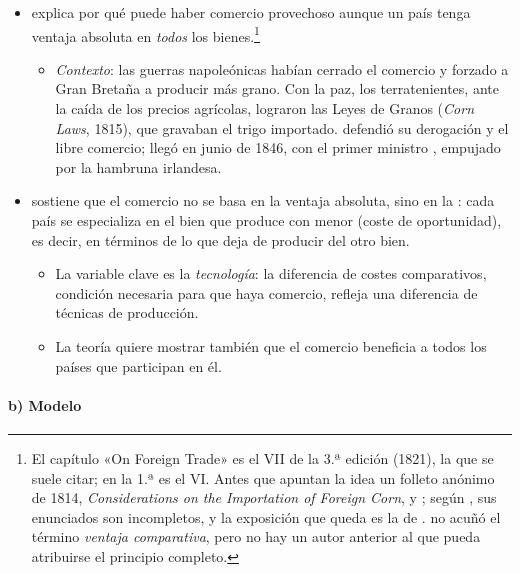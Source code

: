 \documentclass[11pt]{article}
\begin{document}
\begin{itemize}
\item {} explica por qué puede haber comercio provechoso aunque un país tenga ventaja absoluta en \emph{todos} los bienes\nocite{Ricardo1821Principles}.\footnote{El capítulo «On Foreign Trade» es el VII de la 3.ª edición (1821), la que se suele citar; en la 1.ª \parencite*{Ricardo1817Principles} es el VI. Antes que  apuntan la idea un folleto anónimo de 1814, \emph{Considerations on the Importation of Foreign Corn}, y \textcite{Torrens1815Essay}; según \textcite{GrancayGrancay2015Considerations}, sus enunciados son incompletos, y la exposición que queda es la de \nocite{Ruffin2002Ricardo} .  no acuñó el término \emph{ventaja comparativa}, pero no hay un autor anterior al que pueda atribuirse el principio completo.}
  \begin{itemize}
  \item \emph{Contexto}: las guerras napoleónicas habían cerrado el comercio y forzado a Gran Bretaña a producir más grano. Con la paz, los terratenientes, ante la caída de los precios agrícolas, lograron las Leyes de Granos (\emph{Corn Laws}, 1815), que gravaban el trigo importado.  defendió su derogación y el libre comercio; llegó en junio de 1846, con el primer ministro , empujado por la hambruna irlandesa\nocite{GovUK2026Peel}.
  \end{itemize}
\item {} sostiene que el comercio no se basa en la ventaja absoluta, sino en la : cada país se especializa en el bien que produce con menor  (coste de oportunidad), es decir, en términos de lo que deja de producir del otro bien.
  \begin{itemize}
  \item La variable clave es la \emph{tecnología}: la diferencia de costes comparativos, condición necesaria para que haya comercio, refleja una diferencia de técnicas de producción.
  \item La teoría quiere mostrar también que el comercio beneficia a todos los países que participan en él.
  \end{itemize}
\end{itemize}

\paragraph{b) Modelo}
\end{document}
